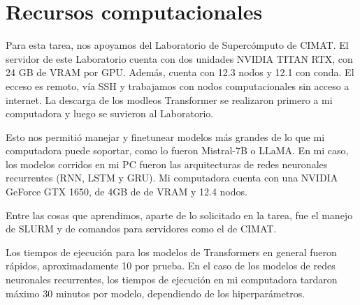 \newpage
{}
\section*{Recursos computacionales}

Para esta tarea, nos apoyamos del Laboratorio de Supercómputo de CIMAT. El servidor de este Laboratorio
cuenta con dos unidades NVIDIA TITAN RTX, con 24 GB de VRAM por GPU. Además, cuenta con 12.3 nodos y 12.1
con conda. El ecceso es remoto, vía SSH y trabajamos con nodos computacionales sin acceso a internet. La 
descarga de los modleos Transformer se realizaron primero a mi computadora y luego se suvieron al Laboratorio. 

Esto nos permitió manejar y finetunear modelos más grandes de lo que mi computadora puede soportar, como 
lo fueron Mistral-7B o LLaMA. En mi caso, los modelos corridos en mi PC fueron las arquitecturas de redes 
neuronales recurrentes (RNN, LSTM y GRU). Mi computadora cuenta con una NVIDIA GeForce GTX 1650, de 4GB de 
de VRAM y 12.4 nodos. 

Entre las cosas que aprendimos, aparte de lo solicitado en la tarea, fue el manejo de SLURM y de comandos
para servidores como el de CIMAT. 

Los tiempos de ejecución para los modelos de Transformers en general fueron rápidos, aproximadamente 10 por prueba. En 
el caso de los modelos de redes neuronales recurrentes, los tiempos de ejecución en mi computadora tardaron máximo 
30 minutos por modelo, dependiendo de los hiperparámetros. 